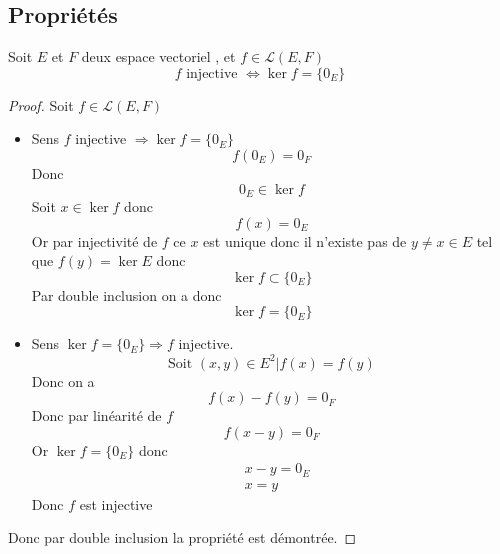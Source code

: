 \documentclass[11pt,colorlinks]{book}
\theoremstyle{mytheoremstyle}
\theoremstyle{mytheoremstyle}
\theoremstyle{mytheoremstyle}
\theoremstyle{mytheoremstyle}
\theoremstyle{mytheoremstyle}
\theoremstyle{mytheoremstyle}
\theoremstyle{mytheoremstyle}
\theoremstyle{mytheoremstyle}
\theoremstyle{myproblemstyle}
\def\mfc#1{\mathcal{#1}}
\def\ev{espace vectoriel }
\def\mor{\mfc{L}(E,F)}
\begin{document}
\subsection{Propriétés}
\begin{prop}
  Soit $E$ et $F$ deux \ev, et $f \in \mor$ 
  \begin{equation*}
    f \text{ injective } \Leftrightarrow \ker f = \{0_E\}
  \end{equation*}
  \begin{proof}
    Soit $f \in \mor$
    \begin{itemize}
      \item Sens $f$ injective $\Rightarrow \ker f = \{0_E\}$
      \begin{equation*}
        f(0_E) = 0_F 
      \end{equation*}
      Donc
      \begin{equation*}
        0_E \in \ker f
      \end{equation*}
      Soit $x \in \ker f$ donc
      \begin{equation*}
        f(x) = 0_E
      \end{equation*}
      Or par injectivité de $f$ ce $x$ est unique donc il n'existe pas de $y \not= x \in E$ tel que $f(y) = \ker E$ donc
      \begin{equation*}
        \ker f \subset \{0_E\}
      \end{equation*}
      Par double inclusion on a donc 
      \begin{equation*}
        \ker f = \{0_E\}
      \end{equation*}
      \item Sens $\ker f = \{0_E\} \Rightarrow f$ injective.
      \begin{equation*}
        \text{Soit } (x,y) \in E^2 | f(x) = f(y)
      \end{equation*}
      Donc on a 
      \begin{equation*}
        f(x) - f(y) = 0_F
      \end{equation*}
      Donc par linéarité de $f$ 
      \begin{equation*}
        f(x - y) = 0_F
      \end{equation*}
      Or $\ker f = \{0_E\}$ donc 
      \begin{align*}
        &x-y = 0_E \\ 
        &x=y
      \end{align*}
      Donc $f$ est injective
    \end{itemize}
    Donc par double inclusion la propriété est démontrée.
  \end{proof}
\end{prop}
\end{document}
